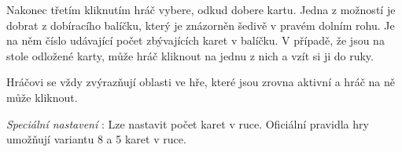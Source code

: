 Nakonec třetím kliknutím hráč vybere, odkud dobere kartu. Jedna z možností je dobrat z dobíracího balíčku, který je znázorněn šedivě v pravém dolním rohu. Je na něm číslo udávající počet zbývajících karet v balíčku. V případě, že jsou na stole odložené karty, může hráč kliknout na jednu z nich a vzít si ji do ruky.

Hráčovi se vždy zvýrazňují oblasti ve hře, které jsou zrovna aktivní a hráč na ně může kliknout.

\emph{Speciální nastavení} : Lze nastavit počet karet v ruce. Oficiální pravidla hry umožňují variantu 8 a 5 karet v ruce.

\endinput
